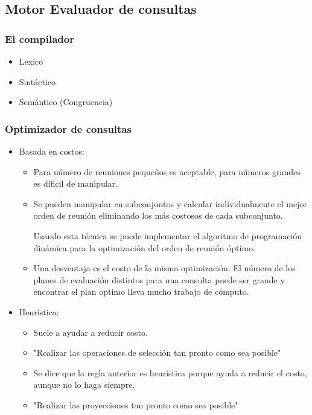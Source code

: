 \documentclass[12pt, fleqn]{report}                             %
\theoremstyle{break}                                            %
\begin{document}
    
    \subsection{Motor Evaluador de consultas}
	    \subsubsection{El compilador}
	    \begin{itemize}
	    	\item Lexico
	    	\item Sintáctico
	    	\item Semántico (Congruencia)
	    \end{itemize}
	    \subsubsection{Optimizador de consultas}
	    \begin{itemize}
	    	\item Basada en costos:
	    			\begin{itemize}
	    				\item Para número de reuniones pequeños es aceptable, para números grandes es dificil de manipular.
	    				\item Se pueden manipular en subconjuntos y calcular individualmente el mejor orden de reunión eliminando los más costosos de cada subconjunto.

	    				Usando esta técnica se puede implementar el algoritmo de programación  dinámica para la optimización del orden de reunión óptimo.
	    				\item Una desventaja es el costo de la misma optimización. El número de los planes de evaluación distintos para una consulta puede ser grande y encontrar el plan optimo lleva mucho trabajo de cómputo.
	    			\end{itemize}
	    	\item Heurística:
	    	\begin{itemize}
	    		\item Suele a ayudar a reducir costo.
	    		\item "Realizar las operaciones de selección tan pronto como sea posible"
	    		\item Se dice que la regla anterior es heurística porque ayuda a reducir el costo, aunque no lo haga siempre.
	    		\item "Realizar las proyecciones tan pronto como sea posible"

	    	\end{itemize}
	    \end{itemize}
\end{document}
